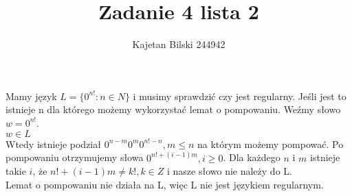 \documentclass{article}
\title{Zadanie 4 lista 2}
\author{Kajetan Bilski 244942}
\begin{document}
	\maketitle

Mamy język $L = \{0^{n!} : n\in N\}$ i musimy sprawdzić czy jest regularny. Jeśli jest to istnieje n dla którego możemy wykorzystać lemat o pompowaniu. Weźmy słowo $w=0^{n!}$.\\
$w\in L$\\
Wtedy istnieje podział $0^{n-m}0^{m}0^{n!-n}, m\leq n$ na którym możemy pompować. Po pompowaniu otrzymujemy słowa $0^{n!+(i-1)m}, i\geq 0$.
Dla każdego $n$ i $m$ istnieje takie $i$, że $n!+(i-1)m\neq k!, k\in Z$ i nasze słowo nie należy do L.\\
Lemat o pompowaniu nie działa na L, więc L nie jest językiem regularnym.
\end{document}
